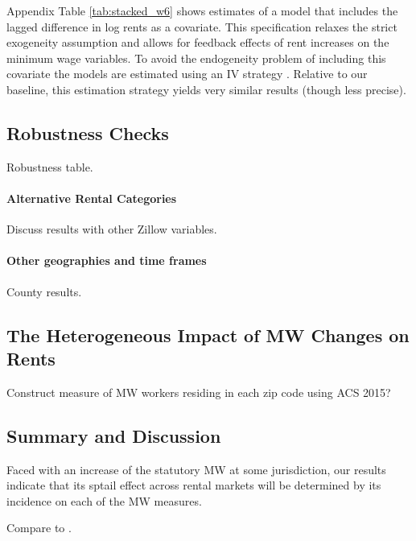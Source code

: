 Appendix Table \ref{tab:stacked_w6} shows estimates of a model that includes
the lagged difference in log rents as a covariate.
This specification relaxes the strict exogeneity assumption and allows for 
feedback effects of rent increases on the minimum wage variables.
To avoid the endogeneity problem of including this covariate the models are 
estimated using an IV strategy \parencite{ArellanoBond1991,ArellanoHonore2001}.
Relative to our baseline, this estimation strategy yields very similar results 
(though less precise).

\subsection{Robustness Checks}\label{sec:robustness_results}

Robustness table.

\paragraph{Alternative Rental Categories}

Discuss results with other Zillow variables.

\paragraph{Other geographies and time frames}

County results.

\subsection{The Heterogeneous Impact of MW Changes on Rents}
\label{sec:heterogeneity_results}

Construct measure of MW workers residing in each zip code using ACS 2015?

\subsection{Summary and Discussion}
\label{sec:results_discussion}

Faced with an increase of the statutory MW at some jurisdiction, our results
indicate that its sptail effect across rental markets will be determined by 
its incidence on each of the MW measures.


Compare to \textcite{Yamagishi2019}.
